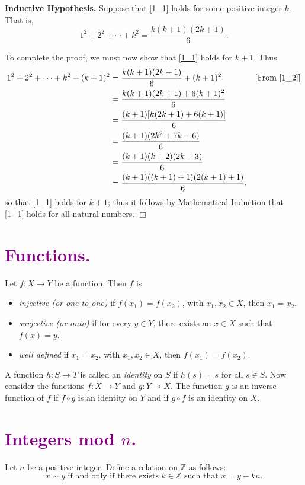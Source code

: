 \documentclass[9pt]{article}
\newcommand{\qed}{\hfill \ensuremath{\Box}}
\newcommand{\Z}{\mathbb{Z}}
\newcommand{\D}{\displaystyle}
\begin{document}
   \textbf{Inductive Hypothesis.} Suppose that \eqref{1_1} holds for some
   positive integer $k$. That is,
   \begin{equation}
      1^2 + 2^2 + \cdots + k^2 = \D\frac{k(k+1)(2k+1)}{6}. \label{1_2}
   \end{equation}

   To complete the proof, we must now show that \eqref{1_1} holds for $k + 1$.
   Thus
   \begin{align*}
      1^2 + 2^2 + \cdots + k^2 + (k+1)^2 &= \frac{k(k+1)(2k+1)}{6} + (k+1)^2
         &[\text{From }\eqref{1_2}]\\
         &= \frac{k(k+1)(2k+1) + 6(k+1)^2}{6} \\
         &= \frac{(k+1)[k(2k+1) + 6(k+1)]}{6} \\
         &= \frac{(k+1)(2k^2+7k+6)}{6} \\
         &= \frac{(k+1)(k+2)(2k+3)}{6} \\
         &= \frac{(k+1)((k+1)+1)(2(k+1)+1)}{6},
   \end{align*}
   so that \eqref{1_1} holds for $k + 1$; thus it follows by Mathematical
   Induction that \eqref{1_1} holds for all natural numbers. \qed

   \section*{\textcolor{purple}{Functions.}} Let $f : X \rightarrow Y$ be a 
   function. Then $f$ is
   \begin{itemize}
      \item \textit{injective (or one-to-one)} if $f(x_1) = f(x_2)$, with
            $x_1, x_2 \in X$, then $x_1 = x_2$.
      \item \textit{surjective (or onto)} if for every $y \in Y$, there exists
            an $x \in X$ such that $f(x) = y$.
      \item \textit{well defined} if $x_1 = x_2$, with $x_1, x_2 \in X$, then
            $f(x_1) = f(x_2)$.
   \end{itemize}

   A function $h : S \rightarrow T$ is called an \textit{identity} on $S$ if
   $h(s) = s$ for all $s \in S$. Now consider the functions
   $f : X \rightarrow Y$ and $g : Y \rightarrow X$. The function $g$ is an
   inverse function of $f$ if $f \circ g$ is an identity on $Y$ and if
   $g \circ f$ is an identity on $X$.

   \section*{\textcolor{purple}{Integers mod $n$.}} Let $n$ be a positive
   integer. Define a relation on $\Z$ as follows:
   $$x \sim y \text{ if and only if there exists }
     k \in \Z \text{ such that } x = y + kn.$$
\end{document}
